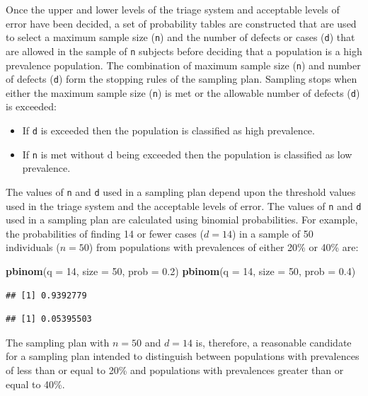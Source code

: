 \documentclass[12pt,a4paper]{book}
\newenvironment{Shaded}{\begin{snugshade}}{\end{snugshade}}
\newcommand{\KeywordTok}[1]{\textcolor[rgb]{0.13,0.29,0.53}{\textbf{#1}}}
\newcommand{\DataTypeTok}[1]{\textcolor[rgb]{0.13,0.29,0.53}{#1}}
\newcommand{\DecValTok}[1]{\textcolor[rgb]{0.00,0.00,0.81}{#1}}
\newcommand{\FloatTok}[1]{\textcolor[rgb]{0.00,0.00,0.81}{#1}}
\newcommand{\NormalTok}[1]{#1}
\theoremstyle{definition}
\theoremstyle{definition}
\theoremstyle{definition}
\theoremstyle{remark}
\begin{document}
Once the upper and lower levels of the triage system and acceptable
levels of error have been decided, a set of probability tables are
constructed that are used to select a maximum sample size (\texttt{n})
and the number of defects or cases (\texttt{d}) that are allowed in the
sample of \texttt{n} subjects before deciding that a population is a
high prevalence population. The combination of maximum sample size
(\texttt{n}) and number of defects (\texttt{d}) form the stopping rules
of the sampling plan. Sampling stops when either the maximum sample size
(\texttt{n}) is met or the allowable number of defects (\texttt{d}) is
exceeded:

\begin{itemize}
\item
  If \texttt{d} is exceeded then the population is classified as high
  prevalence.
\item
  If \texttt{n} is met without d being exceeded then the population is
  classified as low prevalence.
\end{itemize}

The values of \texttt{n} and \texttt{d} used in a sampling plan depend
upon the threshold values used in the triage system and the acceptable
levels of error. The values of \texttt{n} and \texttt{d} used in a
sampling plan are calculated using binomial probabilities. For example,
the probabilities of finding 14 or fewer cases (\(d = 14\)) in a sample
of 50 individuals (\(n = 50\)) from populations with prevalences of
either 20\% or 40\% are:

\begin{Shaded}
\begin{Highlighting}[]
\KeywordTok{pbinom}\NormalTok{(}\DataTypeTok{q =} \DecValTok{14}\NormalTok{, }\DataTypeTok{size =} \DecValTok{50}\NormalTok{, }\DataTypeTok{prob =} \FloatTok{0.2}\NormalTok{)}
\KeywordTok{pbinom}\NormalTok{(}\DataTypeTok{q =} \DecValTok{14}\NormalTok{, }\DataTypeTok{size =} \DecValTok{50}\NormalTok{, }\DataTypeTok{prob =} \FloatTok{0.4}\NormalTok{)}
\end{Highlighting}
\end{Shaded}

\begin{verbatim}
## [1] 0.9392779
\end{verbatim}

\begin{verbatim}
## [1] 0.05395503
\end{verbatim}

The sampling plan with \(n = 50\) and \(d = 14\) is, therefore, a
reasonable candidate for a sampling plan intended to distinguish between
populations with prevalences of less than or equal to 20\% and
populations with prevalences greater than or equal to 40\%.
\end{document}
